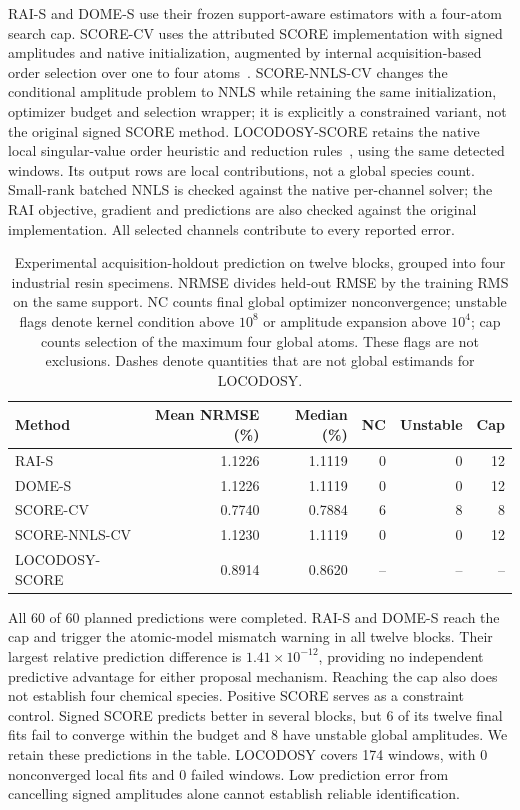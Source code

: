 RAI-S and DOME-S use their frozen support-aware estimators with a four-atom search cap. SCORE-CV uses the attributed SCORE implementation with signed amplitudes and native initialization, augmented by internal acquisition-based order selection over one to four atoms~\cite{score}. SCORE-NNLS-CV changes the conditional amplitude problem to NNLS while retaining the same initialization, optimizer budget and selection wrapper; it is explicitly a constrained variant, not the original signed SCORE method. LOCODOSY-SCORE retains the native local singular-value order heuristic and reduction rules~\cite{locodosy}, using the same detected windows. Its output rows are local contributions, not a global species count. Small-rank batched NNLS is checked against the native per-channel solver; the RAI objective, gradient and predictions are also checked against the original implementation. All selected channels contribute to every reported error.

\begin{table}[htbp]
\caption{Experimental acquisition-holdout prediction on twelve blocks, grouped into four industrial resin specimens. NRMSE divides held-out RMSE by the training RMS on the same support. NC counts final global optimizer nonconvergence; unstable flags denote kernel condition above $10^8$ or amplitude expansion above $10^4$; cap counts selection of the maximum four global atoms. These flags are not exclusions. Dashes denote quantities that are not global estimands for LOCODOSY.}\label{tab:experimentalrevision}
\centering\small
\begin{tabular}{lrrrrr}\toprule
Method & Mean NRMSE (\%) & Median (\%) & NC & Unstable & Cap\\\midrule
RAI-S & 1.1226 & 1.1119 & 0 & 0 & 12\\
DOME-S & 1.1226 & 1.1119 & 0 & 0 & 12\\
SCORE-CV & 0.7740 & 0.7884 & 6 & 8 & 8\\
SCORE-NNLS-CV & 1.1230 & 1.1119 & 0 & 0 & 12\\
LOCODOSY-SCORE & 0.8914 & 0.8620 & -- & -- & --\\
\bottomrule\end{tabular}
\end{table}

All 60 of 60 planned predictions were completed. RAI-S and DOME-S reach the cap
and trigger the atomic-model mismatch warning in all twelve blocks. Their largest
relative prediction difference is $1.41\times10^{-12}$, providing no independent
predictive advantage for either proposal mechanism. Reaching the cap also does
not establish four chemical species. Positive SCORE serves as a constraint
control. Signed SCORE predicts better in several blocks, but 6 of its twelve
final fits fail to converge within the budget and 8 have unstable global
amplitudes. We retain these predictions in the table. LOCODOSY covers 174 windows,
with 0 nonconverged local fits and 0 failed windows. Low prediction error from
cancelling signed amplitudes alone cannot establish reliable identification.



